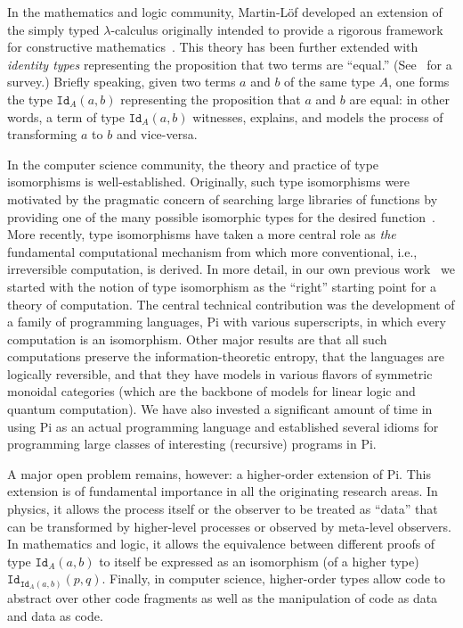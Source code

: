 \documentclass{llncs}
\begin{document}
In the mathematics and logic community, Martin-L\"of developed an extension
of the simply typed $\lambda$-calculus originally intended to provide a
rigorous framework for constructive
mathematics~\cite{citeulike:7374951}. This theory has been further extended
with \emph{identity types} representing the proposition that two terms are
``equal.'' (See~\cite{streicher,warren} for a survey.) Briefly speaking,
given two terms $a$ and $b$ of the same type $A$, one forms the type
$\texttt{Id}_A(a,b)$ representing the proposition that $a$ and $b$ are equal:
in other words, a term of type $\texttt{Id}_A(a,b)$ witnesses, explains, and
models the process of transforming $a$ to $b$ and vice-versa.

In the computer science community, the theory and practice of type
isomorphisms is well-established. Originally, such type isomorphisms were
motivated by the pragmatic concern of searching large libraries of functions
by providing one of the many possible isomorphic types for the desired
function~\cite{Rittri:1989:UTS:99370.99384}. More recently, type isomorphisms
have taken a more central role as \emph{the} fundamental computational
mechanism from which more conventional, i.e., irreversible computation, is
derived. In more detail, in our own previous
work~\cite{James:2012:IE:2103656.2103667,rc2011,rc2012} we started with the
notion of type isomorphism as the ``right'' starting point for a theory of
computation. The central technical contribution was the development of a
family of programming languages, {{Pi}} with various superscripts, in which
every computation is an isomorphism. Other major results are that all such
computations preserve the information-theoretic entropy, that the languages
are logically reversible, and that they have models in various flavors of
symmetric monoidal categories (which are the backbone of models for linear
logic and quantum computation). We have also invested a significant amount of
time in using {{Pi}} as an actual programming language and established
several idioms for programming large classes of interesting (recursive)
programs in {{Pi}}.

A major open problem remains, however: a higher-order extension
of {{Pi}}. This extension is of fundamental importance in all the
originating research areas. In physics, it allows the process itself or the
observer to be treated as ``data'' that can be transformed by higher-level
processes or observed by meta-level observers. In mathematics and logic, it
allows the equivalence between different proofs of type $\texttt{Id}_A(a,b)$
to itself be expressed as an isomorphism (of a higher type)
$\texttt{Id}_{\texttt{Id}_A(a,b)}(p,q)$. Finally, in computer science,
higher-order types allow code to abstract over other code fragments as well
as the manipulation of code as data and data as code.
\end{document}
